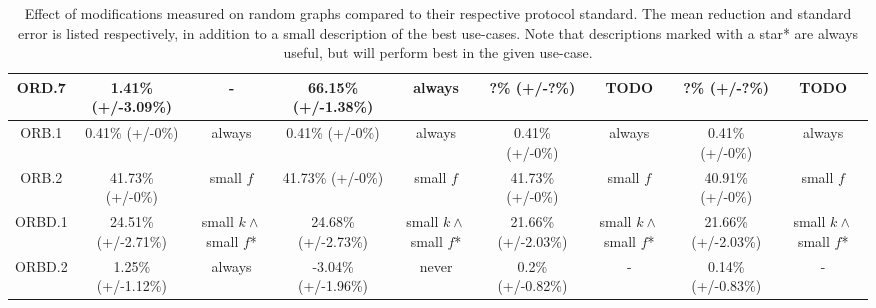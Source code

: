 \begin{table*}
{\begin{tabular}{c|cc|cc|cc|cc|}
\multicolumn{1}{|c|}{ORD.7}       & 1.41\% (+/-3.09\%)            & -               & 66.15\% (+/-1.38\%)             & always               & ?\% (+/-?\%)            & TODO               & ?\% (+/-?\%)             & TODO               \\ \hline
\multicolumn{1}{|c|}{ORB.1}       & 0.41\% (+/-0\%)            & always               & 0.41\% (+/-0\%)             & always               & 0.41\% (+/-0\%)            & always               & 0.41\% (+/-0\%)             & always               \\ \hline
\multicolumn{1}{|c|}{ORB.2}       & 41.73\% (+/-0\%)            & small $f$               & 41.73\% (+/-0\%)             & small $f$               & 41.73\% (+/-0\%)            & small $f$               & 40.91\% (+/-0\%)             & small $f$               \\ \hline
\multicolumn{1}{|c|}{ORBD.1}      & 24.51\% (+/-2.71\%)            & small $k \wedge$ small $f$*                & 24.68\% (+/-2.73\%)             & small $k \wedge$ small $f$*                 & 21.66\% (+/-2.03\%)            & small $k \wedge$ small $f$*                 & 21.66\% (+/-2.03\%)             & small $k \wedge$ small $f$*                 \\ \hline
\multicolumn{1}{|c|}{ORBD.2}      & 1.25\% (+/-1.12\%)            & always               & -3.04\% (+/-1.96\%)             & never               & 0.2\% (+/-0.82\%)            & -               & 0.14\% (+/-0.83\%)             & -               \\ \hline
\end{tabular}
    }
  \caption{Effect of modifications measured on random graphs compared to their respective protocol standard. The mean reduction and standard error is listed respectively, in addition to a small description of the best use-cases. Note that descriptions marked with a star* are always useful, but will perform best in the given use-case.}
  \label{eval:individual-results}
\end{table*}


